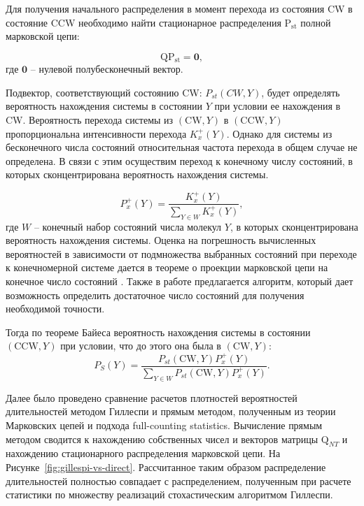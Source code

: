 Для получения начального распределения в момент перехода из состояния CW в состояние CCW необходимо найти стационарное распределения $\boldsymbol{\mathrm{P_{st}}}$ полной марковской цепи:

\begin{equation}
    \boldsymbol{\mathrm{Q}} \boldsymbol{\mathrm{P_{st}}} = \boldsymbol{0},
    \label{eq:transitions-stationary}
\end{equation}
где $\boldsymbol{0}$ -- нулевой полубесконечный вектор.

Подвектор, соответствующий состоянию CW: ${P_{st}(CW, Y)}$, будет определять вероятность нахождения системы в состоянии $Y$ при условии ее нахождения в CW. Вероятность перехода системы из $(\mathrm{CW}, Y)$ в $(\mathrm{CCW}, Y)$ пропорциональна интенсивности перехода $K_x^+(Y)$. Однако для системы из бесконечного числа состояний относительная частота перехода в общем случае не определена. В связи с этим осуществим переход к конечному числу состояний, в которых сконцентрирована вероятность нахождения системы. 

\begin{equation}
    P_x^+(Y)=\frac{K_x^+(Y)}{\sum_{Y\in W} K_x^+(Y)},
    \label{eq:cw-to-ccw-prob}
\end{equation}
где $W$ -- конечный набор состояний числа молекул $Y$, в которых сконцентрирована вероятность нахождения системы. Оценка на погрешность вычисленных вероятностей в зависимости от подмножества выбранных состояний при переходе к конечномерной системе дается в теореме о проекции марковской цепи на конечное число состояний \cite{munsky_finite_2006}. Также в работе предлагается алгоритм, который дает возможность определить достаточное число состояний для получения необходимой точности.

Тогда по теореме Байеса вероятность нахождения системы в состоянии $(\mathrm{CCW}, Y)$ при условии, что до этого она была в $(\mathrm{CW}, Y)$:
\begin{equation}
    P_S(Y)=\frac{P_{st}(\mathrm{CW}, Y) P_x^+(Y)}{\sum_{Y\in W} P_{st}(\mathrm{CW}, Y) P_x^+(Y)}.
    \label{eq:start-prob-solution}
\end{equation}

Далее было проведено сравнение расчетов плотностей вероятностей длительностей методом Гиллеспи и прямым методом, полученным из теории Марковских цепей и подхода full-counting statistics. Вычисление прямым методом сводится к нахождению собственных чисел и векторов матрицы $\boldsymbol{\mathrm{Q}}_{NT}$ и нахождению стационарного распределения марковской цепи. На Рисунке~\cref{fig:gillespi-vs-direct}. Рассчитанное таким образом распределение длительностей полностью совпадает с распределением, полученным при расчете статистики по множеству реализаций стохастическим алгоритмом Гиллеспи.

